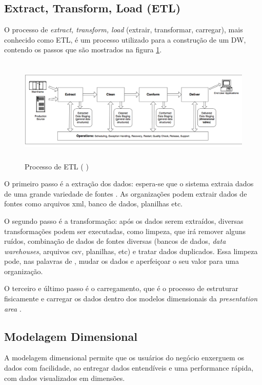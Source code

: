 \subsection{Extract, Transform, Load (ETL)}
O processo de \textit{extract, transform, load} (extrair, transformar, carregar), mais conhecido como ETL, é um processo utilizado para a construção de um DW, contendo os passos que são mostrados na figura \ref{etl}. 
\begin{figure}[H]
\centering
\includegraphics[height=5cm]{imagens/dw_process.png}
\caption{Processo de ETL (\citeauthor{kimball2004} \citeyear{kimball2004})}
\label{etl}
\end{figure}
O primeiro passo é a extração dos dados: espera-se que o sistema extraia dados de uma grande variedade de fontes \citep{kimball2013}. As organizações podem extrair dados de fontes como arquivos xml, banco de dados, planilhas etc.

O segundo passo é a transformação: após os dados serem extraídos, diversas transformações podem ser executadas, como limpeza, que irá remover alguns ruídos, combinação de dados de fontes diversas (bancos de dados, \textit{data warehouses}, arquivos csv, planilhas, etc) e tratar dados duplicados\citep{kimball2013}. Essa limpeza pode, nas palavras de , mudar os dados e aperfeiçoar o seu valor para uma organização.

O terceiro e último passo é o carregamento, que é o processo de estruturar fisicamente e carregar os dados dentro dos modelos dimensionais da \textit{presentation area} \citep{kimball2013}.

\subsection{Modelagem Dimensional}
A modelagem dimensional permite que os usuários do negócio enxerguem os dados com facilidade, ao entregar dados entendíveis e uma performance rápida, com dados visualizados em dimensões.

